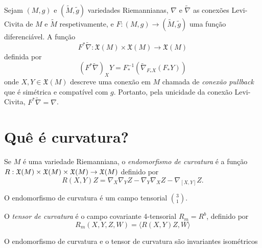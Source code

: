 \begin{observacao}
	Sejam $(M,g)$ e $(\tilde{M}, \tilde{g})$ variedades Riemannianas, $\nabla$ e $\tilde{\nabla}$ as conexões Levi-Civita de $M$ e $\tilde{M}$ respetivamente, e $F: (M,g) \rightarrow (\tilde{M},\tilde{g})$ uma função diferenciável. A função
	\begin{equation*}
		F^* \tilde{\nabla}: \mathfrak{X}(M) \times \mathfrak{X}(M) \rightarrow \mathfrak{X}(M)
	\end{equation*}
	definida por
	\begin{equation*}
		\left( F^* \tilde{\nabla} \right)_X Y = F^{-1}_* \left( \tilde{\nabla}_{F_* X} (F_* Y) \right)
	\end{equation*}
	onde $X,Y \in \mathfrak{X}(M)$ descreve uma conexão em $M$ chamada de \emph{conexão pullback} que é simétrica e compatível com $g$. Portanto, pela unicidade da conexão Levi-Civita, $F^* \tilde{\nabla} = \nabla$.
\end{observacao}

\section{Quê é curvatura?}

\begin{definicao}
	Se $M$ é uma variedade Riemanniana, o \emph{endomorfismo de curvatura} é a função $R: \mathfrak{X}(M) \times \mathfrak{X}(M) \times \mathfrak{X}(M) \rightarrow \mathfrak{X}(M) $ definido por
	\begin{equation*}
		R(X,Y)Z = \nabla_X \nabla_Y Z - \nabla_Y \nabla_X Z - \nabla_{[X,Y]}Z.
	\end{equation*}
\end{definicao}

\begin{proposicao}
	O endomorfismo de curvatura é um campo tensorial $\binom{3}{1}$.
\end{proposicao}

\begin{definicao}
	O \emph{tensor de curvatura} é o campo covariante 4-tensorial $R_m = R^b$, definido por
	\begin{equation*}
		R_m (X,Y,Z,W) = \langle R(X,Y)Z,W \rangle
	\end{equation*}
\end{definicao}

\begin{lema}
	O endomorfismo de curvatura e o tensor de curvatura são invariantes isométricos
\end{lema}


